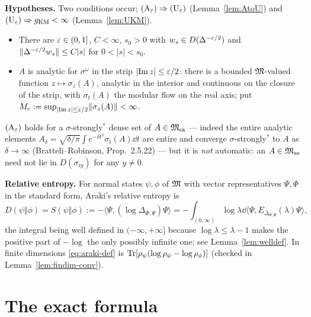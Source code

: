 \documentclass[11pt]{article}
\newcommand{\ip}[2]{\langle#1,#2\rangle}\newcommand{\norm}[1]{\lVert#1\rVert}
\newcommand{\Msa}{\cM_{\mathrm{sa}}}\newcommand{\Mpsa}{\cM'_{\mathrm{sa}}}
\newcommand{\gKM}{g_{\mathrm{KM}}}\newcommand{\gB}{g_{\mathrm B}}
\begin{document}
\textbf{Hypotheses.}  Two conditions occur; $(\mathrm A_\varepsilon)\Rightarrow(\mathrm U_\varepsilon)$
(Lemma~\ref{lem:AtoU}) and $(\mathrm U_\eps)\Rightarrow\gKM<\infty$ (Lemma~\ref{lem:UKM}).
\begin{itemize}[leftmargin=2.2em]
\item[$(\mathrm U_\eps)$] There are $\varepsilon\in(0,1]$, $C<\infty$, $s_0>0$ with
 $w_s\in D(\Delta^{-\varepsilon/2})$ and $\norm{\Delta^{-\eps/2}w_s}\le C\lvert s\rvert$ for $0<\lvert s\rvert<s_0$.
\item[$(\mathrm A_\eps)$] $A$ is analytic for $\sigma^\omega$ in the strip
 $\lvert\operatorname{Im}z\rvert\le\varepsilon/2$: there is a bounded $\mathfrak M$-valued function $z\mapsto\sigma_z(A)$,
 analytic in the interior and continuous on the closure of the strip, with $\sigma_t(A)$ the modular flow on
 the real axis; put $M_\eps:=\sup_{\lvert\operatorname{Im}z\rvert\le\eps/2}\norm{\sigma_z(A)}<\infty$.
\end{itemize}
$(\mathrm A_\eps)$ holds for a $\sigma$-strongly$^*$ dense set of $A\in\Msa$ --- indeed the entire analytic
elements $A_\delta=\sqrt{\delta/\pi}\int e^{-\delta t^2}\sigma_t(A)\dd t$ are entire and converge
$\sigma$-strongly$^*$ to $A$ as $\delta\to\infty$ (Bratteli--Robinson, Prop.~2.5.22) --- but it is
\emph{not} automatic: an $A\in\Msa$ need not lie in $D(\sigma_{iy})$ for any $y\ne0$.

\textbf{Relative entropy.}  For normal states $\psi,\phi$ of $\mathfrak M$ with vector representatives
$\Psi,\Phi$ in the standard form, Araki's relative entropy is
\begin{equation}\label{eq:araki-def}
 D(\psi\Vert\phi)=S(\psi\Vert\phi):=-\ip{\Psi}{(\log\Delta_{\Phi,\Psi})\Psi}
 =-\int_{(0,\infty)}\log\lambda\dd\ip{\Psi}{E_{\Delta_{\Phi,\Psi}}(\lambda)\Psi},
\end{equation}
the integral being well defined in $(-\infty,+\infty]$ because $\log\lambda\le\lambda-1$ makes the positive
part of $-\log$ the only possibly infinite one; see Lemma~\ref{lem:welldef}.  In finite dimensions
\eqref{eq:araki-def} is $\operatorname{Tr}[\rho_\psi(\log\rho_\psi-\log\rho_\phi)]$ (checked in
Lemma~\ref{lem:findim-conv}).

\section{The exact formula}\label{sec:exact}
\end{document}
